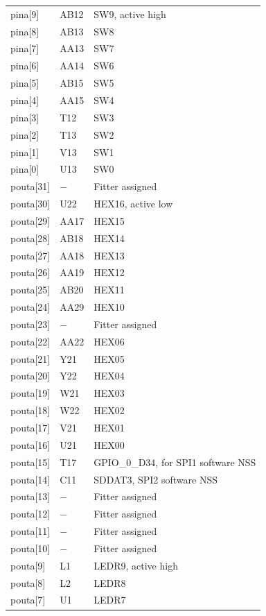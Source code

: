 \documentclass[12pt]{article}
\begin{document}
\begin{longtable}{lll}
pina[9]   & AB12     & SW9, active high \\
pina[8]   & AB13     & SW8 \\
pina[7]   & AA13     & SW7 \\
pina[6]   & AA14     & SW6 \\
pina[5]   & AB15     & SW5 \\
pina[4]   & AA15     & SW4 \\
pina[3]   & T12      & SW3 \\
pina[2]   & T13      & SW2 \\
pina[1]   & V13      & SW1 \\
pina[0]   & U13      & SW0 \\
pouta[31] & $-$      & Fitter assigned \\
pouta[30] & U22      & HEX16, active low \\
pouta[29] & AA17     & HEX15 \\
pouta[28] & AB18     & HEX14 \\
pouta[27] & AA18     & HEX13 \\
pouta[26] & AA19     & HEX12 \\
pouta[25] & AB20     & HEX11 \\
pouta[24] & AA29     & HEX10 \\
pouta[23] & $-$      & Fitter assigned \\
pouta[22] & AA22     & HEX06 \\
pouta[21] & Y21      & HEX05 \\
pouta[20] & Y22      & HEX04 \\
pouta[19] & W21      & HEX03 \\
pouta[18] & W22      & HEX02 \\
pouta[17] & V21      & HEX01 \\
pouta[16] & U21      & HEX00 \\
pouta[15] & T17      & GPIO\_0\_D34, for SPI1 software NSS \\
pouta[14] & C11      & SDDAT3, SPI2 software NSS \\
pouta[13] & $-$      & Fitter assigned \\
pouta[12] & $-$      & Fitter assigned \\
pouta[11] & $-$      & Fitter assigned \\
pouta[10] & $-$      & Fitter assigned \\
pouta[9]  & L1       & LEDR9, active high \\
pouta[8]  & L2       & LEDR8 \\
pouta[7]  & U1       & LEDR7 \\

\end{longtable}
\end{document}
